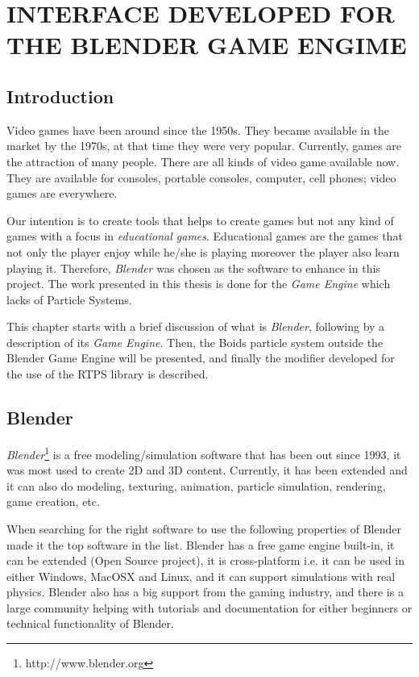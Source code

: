 \chapter{INTERFACE DEVELOPED FOR THE BLENDER GAME ENGIME}

\section{Introduction}

Video games have been around since the 1950s\cite{computerVideoGamesHistory}. They became available in the market by the 1970s, at that time they were very popular. Currently, games are the attraction of many people. There are all kinds of video game available now. They are available for consoles, portable consoles, computer, cell phones; video games are everywhere. 

Our intention is to create tools that helps to create games but not any kind of games with a focus in \textit{educational games}. Educational games are the games that not only the player enjoy while he/she is playing moreover the player also learn playing it. Therefore, \textit{Blender} was chosen as the software to enhance in this project. The work presented in this thesis is done for the \textit{Game Engine} which lacks of Particle Systems.

This chapter starts with a brief discussion of what is \textit{Blender}, following by a description of its \textit{Game Engine}. Then, the Boids particle system outside the Blender Game Engine will be presented, and finally the modifier developed for the use of the RTPS library is described.

\section{Blender}\label{blenderSec}
\textit{Blender}\footnote{http://www.blender.org} is a free modeling/simulation software that has been out since 1993, it was most used to create 2D and 3D content. Currently, it has been extended and it can also do modeling, texturing, animation, particle simulation, rendering, game creation, etc.

When searching for the right software to use the following properties of Blender made it the top software in the list. Blender has a free game engine built-in, it can be extended (Open Source project), it is cross-platform i.e. it can be used in either Windows, MacOSX and Linux, and it can support simulations with real physics. Blender also has a big support from the gaming industry, and there is a large community helping with tutorials and documentation for either beginners or technical functionality of Blender.

